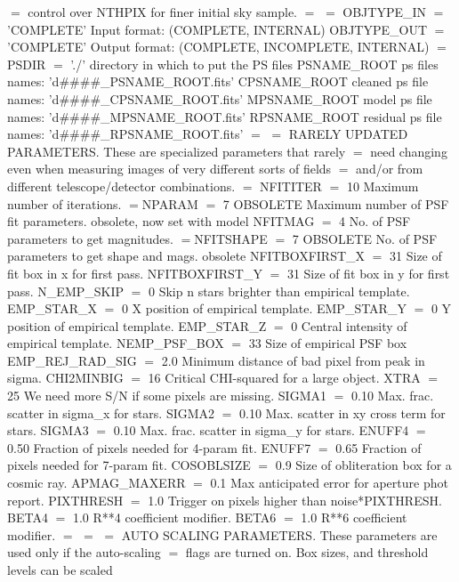 {{$=$ control over NTHPIX for finer initial sky sample.
$=$
$=$
OBJTYPE\_IN $=$ 'COMPLETE'   Input format: (COMPLETE, INTERNAL)
OBJTYPE\_OUT $=$ 'COMPLETE'  Output format: (COMPLETE, INCOMPLETE, INTERNAL)
$=$
PSDIR $=$ './'               directory in which to put the PS files
PSNAME\_ROOT                ps files names: 'd\#\#\#\#\_PSNAME\_ROOT.fits'
CPSNAME\_ROOT               cleaned  ps file names: 'd\#\#\#\#\_CPSNAME\_ROOT.fits'
MPSNAME\_ROOT               model    ps file names: 'd\#\#\#\#\_MPSNAME\_ROOT.fits'
RPSNAME\_ROOT               residual ps file names: 'd\#\#\#\#\_RPSNAME\_ROOT.fits'
$=$
$=$  RARELY UPDATED PARAMETERS.  These are specialized parameters that rarely
$=$  need changing even when measuring images of very different sorts of fields
$=$  and/or from different telescope/detector combinations.
$=$
NFITITER $=$ 10          Maximum number of iterations.
$=$NPARAM $=$ 7            OBSOLETE Maximum number of PSF fit parameters. obsolete, now set with model
NFITMAG $=$ 4            No. of PSF parameters to get magnitudes.
$=$NFITSHAPE $=$ 7         OBSOLETE No. of PSF parameters to get shape and mags.  obsolete
NFITBOXFIRST\_X $=$ 31    Size of fit box in x for first pass.
NFITBOXFIRST\_Y $=$ 31    Size of fit box in y for first pass.
N\_EMP\_SKIP $=$ 0         Skip n stars brighter than empirical template.
EMP\_STAR\_X $=$ 0         X position of empirical template.
EMP\_STAR\_Y $=$ 0         Y position of empirical template.
EMP\_STAR\_Z $=$ 0         Central intensity of empirical template.
NEMP\_PSF\_BOX $=$ 33      Size of empirical PSF box
EMP\_REJ\_RAD\_SIG $=$ 2.0  Minimum distance of bad pixel from peak in sigma.
CHI2MINBIG $=$ 16        Critical CHI-squared for a large object.
XTRA $=$ 25              We need more S/N if some pixels are missing.
SIGMA1 $=$ 0.10          Max. frac. scatter in sigma\_x for stars.
SIGMA2 $=$ 0.10          Max. scatter in xy cross term for stars.
SIGMA3 $=$ 0.10          Max. frac. scatter in sigma\_y for stars.
ENUFF4 $=$ 0.50          Fraction of pixels needed for 4-param fit.
ENUFF7 $=$ 0.65          Fraction of pixels needed for 7-param fit.
COSOBLSIZE $=$ 0.9       Size of obliteration box for a cosmic ray.
APMAG\_MAXERR $=$ 0.1     Max anticipated error for aperture phot report.
PIXTHRESH $=$ 1.0        Trigger on pixels higher than noise*PIXTHRESH.
BETA4 $=$ 1.0            R**4 coefficient modifier.
BETA6 $=$ 1.0            R**6 coefficient modifier.
$=$
$=$
$=$  AUTO SCALING PARAMETERS.  These parameters are used only if the auto-scaling
$=$  flags are turned on.  Box sizes, and threshold levels can be scaled
}}
